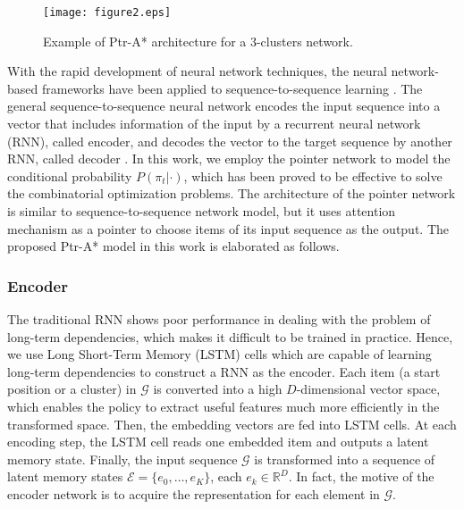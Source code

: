 \documentclass[journal]{IEEEtran}
\begin{document}
	

     \begin{figure*}[t]
		\centering
		\texttt{[image: figure2.eps]}
		\caption{Example of Ptr-A* architecture for a 3-clusters network.}
		\label{figure2}
	\end{figure*}
	

    With the rapid development of neural network techniques, the neural network-based frameworks have been applied to sequence-to-sequence learning \cite{H. Zhang}. The general sequence-to-sequence neural network\cite{M. Nazari} encodes the input sequence into a vector that includes information of the input by a recurrent neural network (RNN), called encoder, and decodes the vector to the target sequence by another RNN, called decoder \cite{O. Vinyals}. In this work, we employ the pointer network to model the conditional probability $P(\pi_t|\cdot)$, which has been proved to be effective to solve the combinatorial optimization problems. The architecture of the pointer network is similar to sequence-to-sequence network model, but it uses attention mechanism as a pointer to choose items of its input sequence as the output.
    The proposed Ptr-A* model in this work is elaborated as follows.

    \subsubsection{Encoder}
    The  traditional RNN shows poor performance in dealing with the problem of long-term dependencies, which makes it difficult to be trained in practice\cite{Y. Bengio}. Hence, we use Long Short-Term Memory (LSTM) cells which are capable of learning long-term dependencies to construct a RNN as the encoder. Each item (a start position or a cluster) in $\bm{\mathcal{G}}$ is converted into a high $D$-dimensional vector space, which enables the policy to extract useful features much more efficiently in the transformed space\cite{W. Koehrsen}. Then, the embedding vectors are fed into LSTM cells. At each encoding step, the LSTM cell reads one embedded item and outputs a latent memory state. Finally, the input sequence $\bm{\mathcal{G}}$ is transformed into a sequence of latent memory states $\bm{\mathcal{E}} = \{e_0, \dots, e_K\}$, each $e_k\in\mathbb{R}^D$. In fact, the motive of the encoder network is to acquire the representation for each element in $\bm{\mathcal{G}}$.
\end{document}
